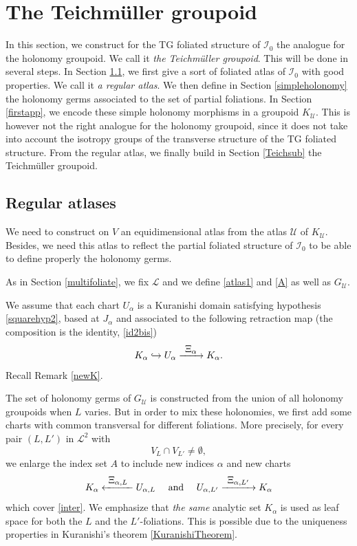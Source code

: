 \documentclass[10pt]{amsart}
\let\mathcal\mathscr
\def\hto{\mathrel{\lhook\joinrel\to}}
\def\To#1{\mathchoice{\xrightarrow{\textstyle\kern4pt#1\kern3pt}}{\stackrel{#1}{\longrightarrow}}{}{}}
\def\From#1{\mathchoice{\xleftarrow{\textstyle~#1~}}{\stackrel{#1}{\longleftarrow}}{}{}}
\theoremstyle{plain}
\theoremstyle{definition}
\theoremstyle{remark}
\numberwithin{equation}{section}
\newcommand{\cI}{\mathcal{I}}
\begin{document}
\section{The Teichmüller groupoid}
\label{Teichmueller}

In this section, we construct for the TG foliated structure of $\cI_0$ the analogue for the holonomy groupoid. We call it \emph{the Teichmüller groupoid}. This will be done in several steps. In Section \ref{regatlas}, we first give a sort of foliated atlas of $\cI_0$ with good properties. We call it \emph{a regular atlas}. We then define in Section \ref{simpleholonomy} the holonomy germs associated to the set of partial foliations. In Section \ref{firstapp}, we encode these simple holonomy morphisms in a groupoid $K_\mathcal U$. This is however not the right analogue for the holonomy groupoid, since it does not take into account the isotropy groups of the transverse structure of the TG foliated structure. From the regular atlas, we finally build in Section \ref{Teichsub} the Teichmüller groupoid.

\subsection{Regular atlases}
\label{regatlas}
We need to construct on $V$ an equidimensional atlas from the atlas $\mathcal U$ of $K_\mathcal U$.
Besides, we need this atlas to reflect the partial foliated structure of $\cI_0$ to be able to define properly the holonomy germs.

As in Section \ref{multifoliate}, we fix $\mathcal L$ and we define \eqref{atlas1} and \eqref{A} as well as $G_{\mathcal U}$.

We assume that each chart $U_{\alpha}$ is a Kuranishi domain satisfying hypothesis \ref{squarehyp2}, based at $J_\alpha$ and associated to the following retraction map (the composition is the identity, \cf \eqref{id2bis})\vspace*{-3pt}
\begin{equation}
\label{id2}
K_{\alpha}\hto U_{\alpha} \To{\Xi_{\alpha}}K_{\alpha}.
\end{equation}
Recall Remark \ref{newK}.

The set of holonomy germs of $G_{\mathcal U}$ is constructed from the union of all holonomy groupoids when $L$ varies. But in order to mix these holonomies, we first add some charts with common transversal for different foliations. More precisely, for every pair $(L,L')$ in $\mathcal L^2$ with
\begin{equation}
\label{inter}
V_L\cap V_{L'}\not =\emptyset,
\end{equation}
we enlarge the index set $A$ to include new indices $\alpha$ and new charts
\begin{equation}
\label{atlas2}
K_{\alpha} \From{\Xi_{\alpha, L}}U_{\alpha,L}\quad\text{ and }\quad U_{\alpha,L'} \To{\Xi_{\alpha, L'}} K_{\alpha}
\end{equation}
which cover \eqref{inter}. We emphasize that \emph{the same} analytic set $K_{\alpha}$ is used as leaf space for both the $L$ and the $L'$-foliations. This is possible due to the uniqueness properties in Kuranishi's theorem \ref{KuranishiTheorem}.
\end{document}
